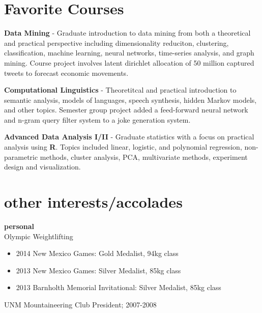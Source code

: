 \documentclass[]{friggeri-cv} %
\begin{document}
\section{Favorite Courses}
\begin{description}
  \item \textbf{Data Mining } - 
    Graduate introduction to data mining from both a theoretical and practical
    perspective including dimensionality reduciton, clustering, classification,
    machine learning, neural networks, time-series analysis, and graph mining.
    Course project involves latent dirichlet allocation of 50 million captured
    tweets to forecast economic movements. \hfill \\
   \item \textbf{Computational Linguistics} - 
     Theoretitcal and practical introduction to semantic analysis, models of
     languages, speech synthesis, hidden Markov models, and other topics.
     Semester group project added a feed-forward neural network and n-gram
     query filter system to a joke generation system. \hfill \\
 \item \textbf{Advanced Data Analysis I/II} - 
     Graduate statistics with a focus on practical analysis using \textbf{R}.
     Topics included linear, logistic, and polynomial regression,
     non-parametric methods, cluster analysis, PCA, multivariate methods,
     experiment design and visualization.
\end{description}


\section{other interests/accolades}


\textbf{personal} \\
Olympic Weightlifting 
\begin{itemize}
\item 2014 New Mexico Games: Gold Medalist, 94kg class
\item 2013 New Mexico Games: Silver Medalist, 85kg class
\item 2013 Barnholth Memorial Invitational: Silver Medalist, 85kg class
\end{itemize}
UNM Mountaineering Club President; 2007-2008 \\
\end{document}
